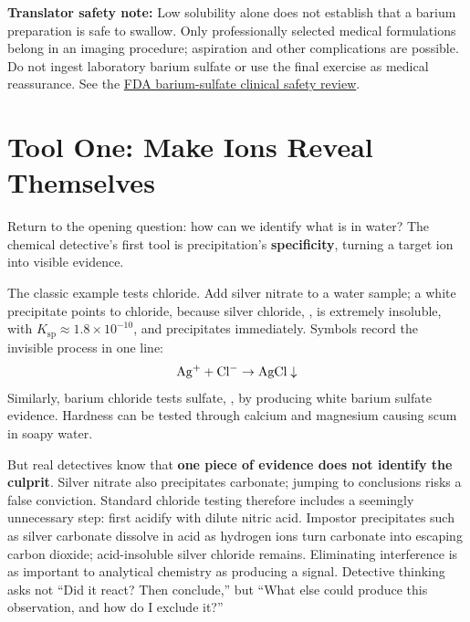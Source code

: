 \textbf{Translator safety note:} Low solubility alone does not establish that a barium preparation is safe to swallow. Only professionally selected medical formulations belong in an imaging procedure; aspiration and other complications are possible. Do not ingest laboratory barium sulfate or use the final exercise as medical reassurance. See the \href{https://www.accessdata.fda.gov/drugsatfda_docs/nda/2016/208844Orig1s000MedR.pdf}{FDA barium-sulfate clinical safety review}.

\section{Tool One: Make Ions Reveal Themselves}

Return to the opening question: how can we identify what is in water? The chemical detective's first tool is precipitation's \textbf{specificity}, turning a target ion into visible evidence.

The classic example tests chloride. Add silver nitrate to a water sample; a white precipitate points to chloride, because silver chloride, , is extremely insoluble, with $K_{\mathrm{sp}}\approx1.8\times10^{-10}$, and precipitates immediately. Symbols record the invisible process in one line:
\[\mathrm{Ag^+} + \mathrm{Cl^-} \rightarrow \mathrm{AgCl}\downarrow\]
Similarly, barium chloride tests sulfate, , by producing white barium sulfate evidence. Hardness can be tested through calcium and magnesium causing scum in soapy water.

But real detectives know that \textbf{one piece of evidence does not identify the culprit}. Silver nitrate also precipitates carbonate; jumping to conclusions risks a false conviction. Standard chloride testing therefore includes a seemingly unnecessary step: first acidify with dilute nitric acid. Impostor precipitates such as silver carbonate dissolve in acid as hydrogen ions turn carbonate into escaping carbon dioxide; acid-insoluble silver chloride remains. Eliminating interference is as important to analytical chemistry as producing a signal. Detective thinking asks not ``Did it react? Then conclude,'' but ``What else could produce this observation, and how do I exclude it?''

